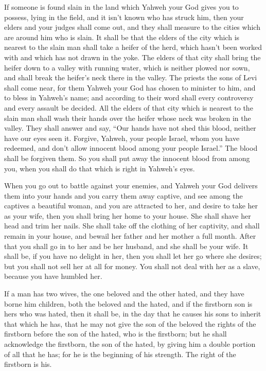  If someone is found slain in the land which Yahweh your
God gives you to possess, lying in the field, and it isn't known who has
struck him,  then your elders and your judges shall come
out, and they shall measure to the cities which are around him who is
slain.  It shall be that the elders of the city which is
nearest to the slain man shall take a heifer of the herd, which hasn't
been worked with and which has not drawn in the yoke.  The
elders of that city shall bring the heifer down to a valley with running
water, which is neither plowed nor sown, and shall break the heifer's
neck there in the valley.  The priests the sons of Levi
shall come near, for them Yahweh your God has chosen to minister to him,
and to bless in Yahweh's name; and according to their word shall every
controversy and every assault be decided.  All the elders
of that city which is nearest to the slain man shall wash their hands
over the heifer whose neck was broken in the valley.  They
shall answer and say, ``Our hands have not shed this blood, neither have
our eyes seen it.  Forgive, Yahweh, your people Israel,
whom you have redeemed, and don't allow innocent blood among your people
Israel.'' The blood shall be forgiven them.  So you shall
put away the innocent blood from among you, when you shall do that which
is right in Yahweh's eyes.

 When you go out to battle against your enemies, and
Yahweh your God delivers them into your hands and you carry them away
captive,  and see among the captives a beautiful woman,
and you are attracted to her, and desire to take her as your wife,
 then you shall bring her home to your house. She shall
shave her head and trim her nails.  She shall take off
the clothing of her captivity, and shall remain in your house, and
bewail her father and her mother a full month. After that you shall go
in to her and be her husband, and she shall be your wife.
 It shall be, if you have no delight in her, then you
shall let her go where she desires; but you shall not sell her at all
for money. You shall not deal with her as a slave, because you have
humbled her.

 If a man has two wives, the one beloved and the other
hated, and they have borne him children, both the beloved and the hated,
and if the firstborn son is hers who was hated,  then it
shall be, in the day that he causes his sons to inherit that which he
has, that he may not give the son of the beloved the rights of the
firstborn before the son of the hated, who is the firstborn;
 but he shall acknowledge the firstborn, the son of the
hated, by giving him a double portion of all that he has; for he is the
beginning of his strength. The right of the firstborn is his.

